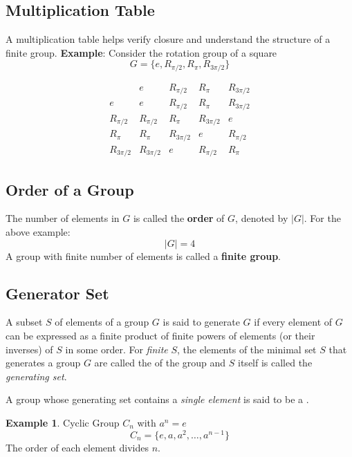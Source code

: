 \documentclass[a4paper,12pt]{article}
\theoremstyle{definition}
\newtheorem{example}{Example}[section]
\begin{document}
\subsection{Multiplication Table}

A multiplication table helps verify closure and understand the structure of a finite group.
\newline
\textbf{Example}: Consider the rotation group of a square
\[
G = \{ e, R_{\pi/2}, R_{\pi}, R_{3\pi/2} \}
\]

\[
\begin{array}{c|cccc}
 & e & R_{\pi/2} & R_{\pi} & R_{3\pi/2} \\
\hline
e & e & R_{\pi/2} & R_{\pi} & R_{3\pi/2} \\
R_{\pi/2} & R_{\pi/2} & R_{\pi} & R_{3\pi/2} & e \\
R_{\pi} & R_{\pi} & R_{3\pi/2} & e & R_{\pi/2} \\
R_{3\pi/2} & R_{3\pi/2} & e & R_{\pi/2} & R_{\pi}
\end{array}
\]


\subsection{Order of a Group}

The number of elements in $G$ is called the \textbf{order} of $G$,
denoted by $|G|$. For the above example:
\[
|G| = 4
\]
A group with finite number of elements is called a \textbf{finite group}.

\subsection{Generator Set}
A subset $S$ of elements of a group $G$ is said to generate $G$ if every
element of $G$ can be expressed as a finite product of finite powers of elements (or
their inverses) of $S$ in some order. For \emph{finite} $S$, the elements of the minimal set $S$ that generates a group $G$ are called the  of the group and $S$ itself is called the \emph{generating set}.

A group whose generating set contains a \emph{single element} is said to be a .

\begin{example}
    Cyclic Group $C_n$ 
    with $a^n = e$
    \[
    C_n = \{ e, a, a^2, \dots, a^{n-1} \}
    \]
    The order of each element divides $n$.
\end{example}
\end{document}
